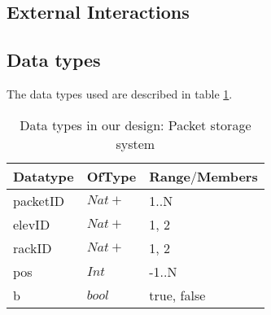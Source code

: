 \subsection*{External Interactions}


\subsection*{Data types}
The data types used are described in table \ref{tab: data_types}.
\begin{table}[ht]
\centering
\begin{tabular}{|l|l|l|}\hline
Datatype & OfType & Range$\slash$Members\\\hline
packetID & $Nat+$ & {1..N} \\\hline
elevID & $Nat+$ & {1, 2}\\\hline
rackID & $Nat+$ & {1, 2}\\\hline
pos & $Int$ & {-1..N}\\\hline
b & $bool$ & {true, false} \\\hline
\end{tabular}
\caption{Data types in our design: Packet storage system }
\label{tab: data_types}
\end{table}


